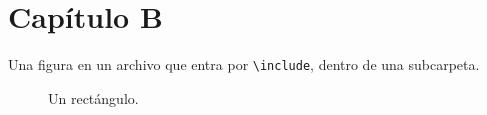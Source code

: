 \section{Capítulo B}

Una figura en un archivo que entra por \texttt{\textbackslash include}, dentro de una subcarpeta.

\begin{figure}[ht]
  \centering
  \caption{Un rectángulo.}
\end{figure}
